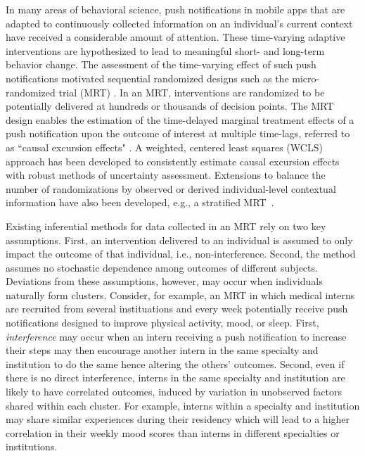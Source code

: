 \documentclass[12pt]{article}
\begin{document}
In many areas of behavioral science, push notifications in mobile apps that are adapted to continuously collected information on an individual's current context have received a considerable amount of attention.  These time-varying adaptive interventions are hypothesized to lead to meaningful short- and long-term behavior change. The assessment of the time-varying effect of such push notifications motivated sequential randomized designs such as the micro-randomized trial (MRT) \citep{Nahum2017, KlasnjaMRT}. In an MRT, interventions are randomized to be potentially delivered at hundreds or thousands of decision points. The MRT design enables the estimation of the time-delayed marginal treatment effects of a push notification upon the outcome of interest at multiple time-lags, referred to as ``causal excursion effects" \citep{Boruvkaetal, Qian2021}. A weighted, centered least squares (WCLS) approach has been developed to consistently estimate causal excursion effects with robust methods of uncertainty assessment. Extensions to balance the number of randomizations by observed or derived individual-level contextual information have also been developed, e.g., a stratified MRT~\citep{DempseyAOAS}.

Existing inferential methods for data collected in an MRT rely on two key assumptions. First, an intervention delivered to an individual is assumed to only impact the outcome of that individual, i.e., non-interference. Second, the method assumes no stochastic dependence among outcomes of different subjects. Deviations from these assumptions, however, may occur when individuals naturally form clusters.  Consider, for example, an MRT in which medical interns are recruited from several instituations and every week potentially receive push notifications designed to improve physical activity, mood, or sleep. First, \textit{interference} may occur when an intern receiving a push notification to increase their steps may then encourage another intern in the same specialty and institution to do the same hence altering the others' outcomes. Second, even if there is no direct interference, interns in the same specialty and institution are likely to have correlated outcomes, induced by variation in unobserved factors shared within each cluster. For example, interns within a specialty and institution may share similar experiences during their residency which will lead to a higher correlation in their weekly mood scores than interns in different specialties or institutions.
\end{document}
